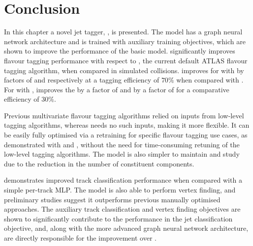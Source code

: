 




\section{Conclusion}\label{sec:gnn_conclusion}

In this chapter a novel jet tagger, \GNN, is presented.
The model has a graph neural network architecture and is trained with auxiliary training objectives, which are shown to improve the performance of the basic model.
\GNN significantly improves flavour tagging performance with respect to \DLr, the current default ATLAS flavour tagging algorithm, when compared in simulated collisions.
\GNN improves \clrej for \ttbarjets with \ttbarpt by factors of \ttbclo and \ttbllo respectively at a \bjet tagging efficiency of $70\%$ when compared with \DLr.
For \Zprimejets with \Zprimept, \GNN improves the \crej by a factor of \zpbclo and \lrej by a factor of \zpbllo for a comparative \bjet efficiency of $30\%$.

Previous multivariate flavour tagging algorithms relied on inputs from low-level tagging algorithms, whereas \GNN needs no such inputs, making it more flexible. It can be easily fully optimised via a retraining for specific flavour tagging use cases, as demonstrated with \ctag and \highpt \btag, without the need for time-consuming retuning of the low-level tagging algorithms.
The model is also simpler to maintain and study due to the reduction in the number of constituent components.

\GNN demonstrates improved track classification performance when compared with a simple per-track MLP.
The model is also able to perform vertex finding, and preliminary studies suggest it outperforms previous manually optimised approaches.
The auxiliary track classification and vertex finding objectives are shown to significantly contribute to the performance in the jet classification objective, and, along with the more advanced graph neural network architecture, are directly responsible for the improvement over \DLr.

